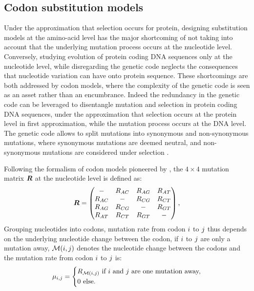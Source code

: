 \subsection{Codon substitution models}
Under the approximation that selection occurs for protein, designing substitution models at the amino-acid level has the major shortcoming of not taking into account that the underlying mutation process occurs at the nucleotide level.
Conversely, studying evolution of protein coding \acrshort{DNA} sequences only at the nucleotide level, while disregarding the genetic code neglects the consequences that nucleotide variation can have onto protein sequence.
These shortcomings are both addressed by \gls{codon} models, where the complexity of the genetic code is seen as an asset rather than an encumbrance.
Indeed the redundancy in the genetic code can be leveraged to disentangle mutation and selection in protein coding \acrshort{DNA} sequences, under the approximation that selection occurs at the protein level in first approximation, while the mutation process occurs at the \acrshort{DNA} level.
The genetic code allows to split mutations into synonymous and non-synonymous mutations, where synonymous mutations are deemed neutral, and non-synonymous mutations are considered under selection \citep{Muse1994,Goldman1994}.

Following the formalism of codon models pioneered by \citet{Muse1994}, the $4 \times 4$ mutation matrix $\bm{R}$ at the nucleotide level is defined as:
\begin{equation}
\label{eq:mutrates}
\bm{R} = \begin{pmatrix}
- & {R_{AC}} & 		{R_{AG}} & 		{R_{AT}} \\
{R_{AC}} & - &  {R_{CG}} &		{R_{CT}} \\
{R_{AG}} & 		{R_{CG}} & - &  {R_{GT}} \\
{R_{AT}} & 		{R_{CT}} & 		{R_{GT}} & -
\end{pmatrix},
\end{equation}
Grouping nucleotides into codons, mutation rate from \gls{codon} ${i}$ to ${j}$ thus depends on the underlying nucleotide change between the \gls{codon}, if ${i}$ to ${j}$ are only a mutation away, $\mathcal{M}({i}, {j})$ denotes the nucleotide change between the codons and the mutation rate from \gls{codon} ${i}$ to ${j}$ is:
\begin{equation}
\mu_{{i}, {j}} = 
\begin{dcases}
 R_{\mathcal{M}({i}, {j})}  \text{ if ${i}$ and ${j}$ are one mutation away,} \\
 0 \text{ else.}
\end{dcases}
\end{equation}

